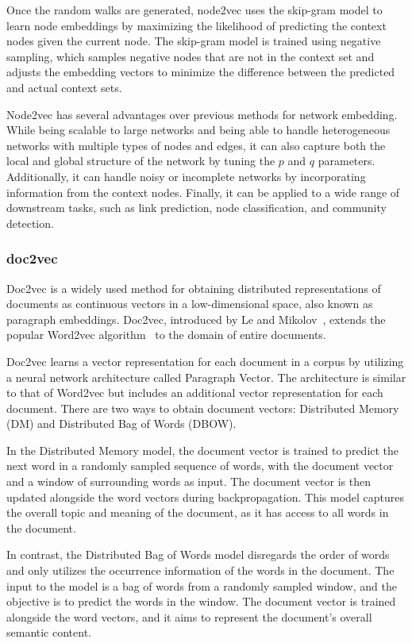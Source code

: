 Once the random walks are generated, node2vec uses the skip-gram model to learn node embeddings by maximizing the likelihood of predicting the context nodes given the current node. The skip-gram model is trained using negative sampling, which samples negative nodes that are not in the context set and adjusts the embedding vectors to minimize the difference between the predicted and actual context sets.

Node2vec has several advantages over previous methods for network embedding. While being scalable to large networks and being able to handle heterogeneous networks with multiple types of nodes and edges, it can also capture both the local and global structure of the network by tuning the $p$ and $q$ parameters. Additionally, it can handle noisy or incomplete networks by incorporating information from the context nodes. Finally, it can be applied to a wide range of downstream tasks, such as link prediction, node classification, and community detection.

\subsubsection{doc2vec}
Doc2vec is a widely used method for obtaining distributed representations of documents as continuous vectors in a low-dimensional space, also known as paragraph embeddings. Doc2vec, introduced by Le and Mikolov~\cite{2014doc2vec}, extends the popular Word2vec algorithm~\cite{mikolov2013distributed} to the domain of entire documents.

Doc2vec learns a vector representation for each document in a corpus by utilizing a neural network architecture called Paragraph Vector. The architecture is similar to that of Word2vec but includes an additional vector representation for each document. There are two ways to obtain document vectors: Distributed Memory (DM) and Distributed Bag of Words (DBOW). 

In the Distributed Memory model, the document vector is trained to predict the next word in a randomly sampled sequence of words, with the document vector and a window of surrounding words as input. The document vector is then updated alongside the word vectors during backpropagation. This model captures the overall topic and meaning of the document, as it has access to all words in the document.

In contrast, the Distributed Bag of Words model disregards the order of words and only utilizes the occurrence information of the words in the document. The input to the model is a bag of words from a randomly sampled window, and the objective is to predict the words in the window. The document vector is trained alongside the word vectors, and it aims to represent the document's overall semantic content.

